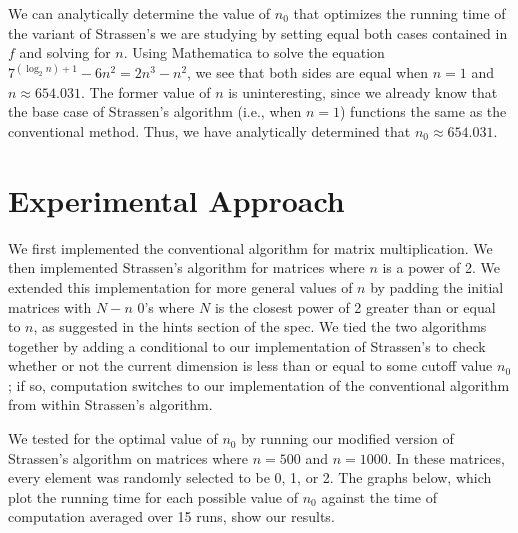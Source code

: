 \documentclass[solution, letterpaper]{cs121}
\begin{document}
We can analytically determine the value of $n_0$ that optimizes the running time of the variant of Strassen's we are studying by setting equal both cases contained in $f$ and solving for $n$. Using Mathematica to solve the equation $7^{(\log_2 n) + 1}-6 n^2 = 2n^3 - n^2$, we see that both sides are equal when $n = 1$ and $n \approx 654.031$. The former value of $n$ is uninteresting, since we already know that the base case of Strassen's algorithm (i.e., when $n=1$) functions the same as the conventional method. Thus, we have analytically determined that $n_0 \approx 654.031$.

\section*{Experimental Approach}

\hspace{4mm}We first implemented the conventional algorithm for matrix multiplication. We then implemented Strassen's algorithm for matrices where $n$ is a power of 2. We extended this implementation for more general values of $n$ by padding the initial matrices with $N - n$  0's where $N$ is the closest power of 2 greater than or equal to $n$, as suggested in the hints section of the spec. We tied the two algorithms together by adding a conditional to our implementation of Strassen's to check whether or not the current dimension is less than or equal to some cutoff value $n_0$; if so, computation switches to our implementation of the conventional algorithm from within Strassen's algorithm. 

We tested for the optimal value of $n_0$ by running our modified version of Strassen's algorithm on matrices where $n=500$ and $n=1000$. In these matrices, every element was randomly selected to be 0, 1, or 2. The graphs below, which plot the running time for each possible value of $n_0$ against the time of computation averaged over 15 runs, show our results. 
\end{document}
